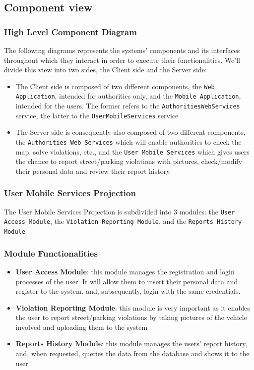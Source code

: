 \documentclass[12pt,a4paper]{article}
\begin{document}
\subsection{Component view}
\subsubsection{High Level Component Diagram}
The following diagrams represents the systems' components and its interfaces throughout which they interact in order to execute their functionalities. We'll divide this view into two sides, the Client side and the Server side:
\begin{itemize}
\item The Client side is composed of two different components, the \texttt{Web Application}, intended for authorities only, and the \texttt{Mobile Application}, intended for the users. The former refers to the \texttt{AuthoritiesWebServices} service, the latter to the \texttt{UserMobileServices} service
\item The Server side is consequently also composed of two different components, the \texttt{Authorities Web Services} which will enable authorities to check the map, solve violations, etc., and the \texttt{User Mobile Services} which gives users the chance to report street/parking violations with pictures, check/modify their personal data and review their report history
\end{itemize}

\subsubsection{User Mobile Services Projection}
The User Mobile Services Projection is subdivided into 3 modules: the \texttt{User Access Module}, the \texttt{Violation Reporting Module},  and the \texttt{Reports History Module}
\subsubsection*{Module Functionalities}
\begin{itemize}
\item \textbf{User Access Module}: this module manages the registration and login processes of the user. It will allow them to insert their personal data and register to the system, and, subsequently, login with the same credentials.
\item \textbf{Violation Reporting Module}: this module is very important as it enables the user to report street/parking violations by taking pictures of the vehicle involved and uploading them to the system
\item \textbf{Reports History Module}: this module manages the users' report history, and, when requested, queries the data from the database and shows it to the user
\end{itemize}
\end{document}
